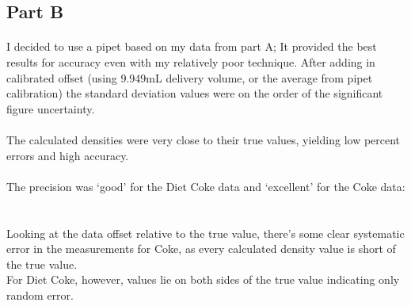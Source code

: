\documentclass[fleqn,titlepage]{article}
\begin{document}
  \subsection*{Part B}
    \paragraph{} I decided to use a pipet based on my data from part A; It provided the best results for accuracy even with my relatively poor technique. After adding in calibrated offset (using 9.949mL delivery volume, or the average from pipet calibration) the standard deviation values were on the order of the significant figure uncertainty.

    \paragraph{} The calculated densities were very close to their true values, yielding low percent errors and high accuracy. \\

    \paragraph{} The precision was `good' for the Diet Coke data and `excellent' for the Coke data: \\
     \\

    \paragraph{} Looking at the data offset relative to the true value, there's some clear systematic error in the measurements for Coke, as every calculated density value is short of the true value. 
     \\[0.3cm]
    For Diet Coke, however, values lie on both sides of the true value indicating only random error.
\end{document}
